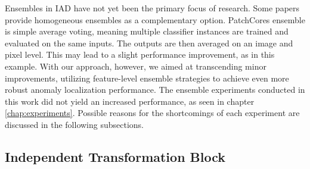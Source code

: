 Ensembles in IAD have not yet been the primary focus of research. Some papers \cite{patchCore2022} provide homogeneous ensembles as a complementary option. 
PatchCores ensemble is simple average voting, meaning multiple classifier instances are trained and evaluated on the same inputs. The outputs are then averaged on an image and pixel level. 
This may lead to a slight performance improvement, as in this example. 
With our approach, however, we aimed at transcending minor improvements, utilizing feature-level ensemble strategies to achieve even more robust anomaly localization performance.
The ensemble experiments conducted in this work did not yield an increased performance, as seen in chapter \ref{chap:experiments}. 
Possible reasons for the shortcomings of each experiment are discussed in the following subsections.

\subsection{Independent Transformation Block}
\label{subsec:ITBfaildiscussion}

